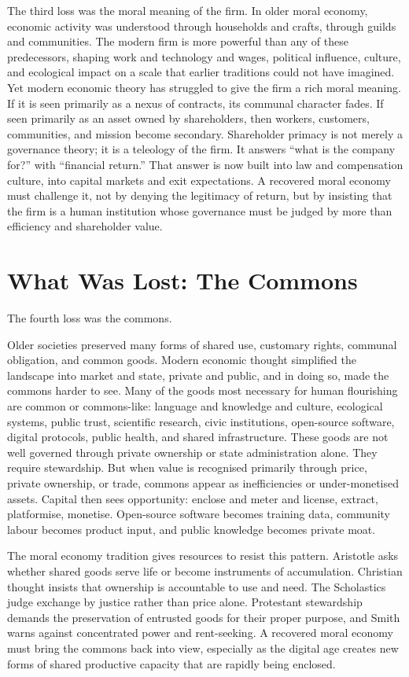 \documentclass[11pt,a4paper,oneside]{book}
\begin{document}
The third loss was the moral meaning of the firm. In older moral economy, economic activity was understood through households and crafts, through guilds and communities. The modern firm is more powerful than any of these predecessors, shaping work and technology and wages, political influence, culture, and ecological impact on a scale that earlier traditions could not have imagined. Yet modern economic theory has struggled to give the firm a rich moral meaning. If it is seen primarily as a nexus of contracts, its communal character fades. If seen primarily as an asset owned by shareholders, then workers, customers, communities, and mission become secondary. Shareholder primacy is not merely a governance theory; it is a teleology of the firm. It answers ``what is the company for?'' with ``financial return.'' That answer is now built into law and compensation culture, into capital markets and exit expectations. A recovered moral economy must challenge it, not by denying the legitimacy of return, but by insisting that the firm is a human institution whose governance must be judged by more than efficiency and shareholder value.

\section*{What Was Lost: The Commons}

The fourth loss was the commons.

Older societies preserved many forms of shared use, customary rights, communal obligation, and common goods. Modern economic thought simplified the landscape into market and state, private and public, and in doing so, made the commons harder to see. Many of the goods most necessary for human flourishing are common or commons-like: language and knowledge and culture, ecological systems, public trust, scientific research, civic institutions, open-source software, digital protocols, public health, and shared infrastructure. These goods are not well governed through private ownership or state administration alone. They require stewardship. But when value is recognised primarily through price, private ownership, or trade, commons appear as inefficiencies or under-monetised assets. Capital then sees opportunity: enclose and meter and license, extract, platformise, monetise. Open-source software becomes training data, community labour becomes product input, and public knowledge becomes private moat.

The moral economy tradition gives resources to resist this pattern. Aristotle asks whether shared goods serve life or become instruments of accumulation. Christian thought insists that ownership is accountable to use and need. The Scholastics judge exchange by justice rather than price alone. Protestant stewardship demands the preservation of entrusted goods for their proper purpose, and Smith warns against concentrated power and rent-seeking. A recovered moral economy must bring the commons back into view, especially as the digital age creates new forms of shared productive capacity that are rapidly being enclosed.
\end{document}
